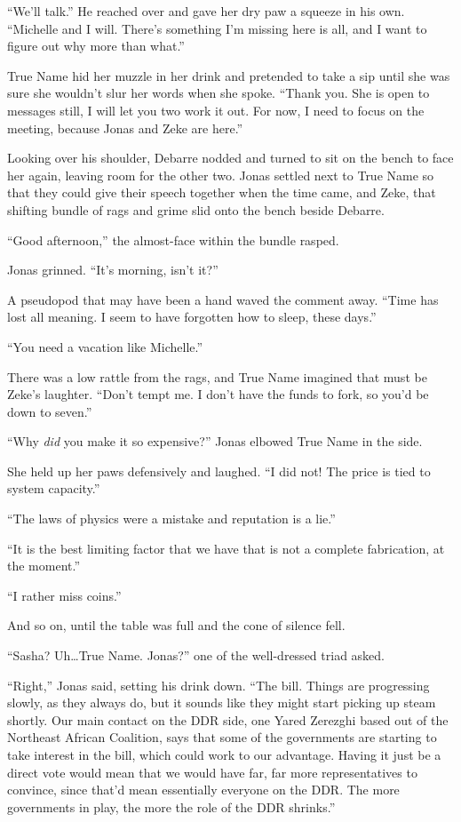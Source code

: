 ``We'll talk.'' He reached over and gave her dry paw a squeeze in his own. ``Michelle and I will. There's something I'm missing here is all, and I want to figure out why more than what.''

True Name hid her muzzle in her drink and pretended to take a sip until she was sure she wouldn't slur her words when she spoke. ``Thank you. She is open to messages still, I will let you two work it out. For now, I need to focus on the meeting, because Jonas and Zeke are here.''

Looking over his shoulder, Debarre nodded and turned to sit on the bench to face her again, leaving room for the other two. Jonas settled next to True Name so that they could give their speech together when the time came, and Zeke, that shifting bundle of rags and grime slid onto the bench beside Debarre.

``Good afternoon,'' the almost-face within the bundle rasped.

Jonas grinned. ``It's morning, isn't it?''

A pseudopod that may have been a hand waved the comment away. ``Time has lost all meaning. I seem to have forgotten how to sleep, these days.''

``You need a vacation like Michelle.''

There was a low rattle from the rags, and True Name imagined that must be Zeke's laughter. ``Don't tempt me. I don't have the funds to fork, so you'd be down to seven.''

``Why \emph{did} you make it so expensive?'' Jonas elbowed True Name in the side.

She held up her paws defensively and laughed. ``I did not! The price is tied to system capacity.''

``The laws of physics were a mistake and reputation is a lie.''

``It is the best limiting factor that we have that is not a complete fabrication, at the moment.''

``I rather miss coins.''

And so on, until the table was full and the cone of silence fell.

``Sasha? Uh\ldots True Name. Jonas?'' one of the well-dressed triad asked.

``Right,'' Jonas said, setting his drink down. ``The bill. Things are progressing slowly, as they always do, but it sounds like they might start picking up steam shortly. Our main contact on the DDR side, one Yared Zerezghi based out of the Northeast African Coalition, says that some of the governments are starting to take interest in the bill, which could work to our advantage. Having it just be a direct vote would mean that we would have far, far more representatives to convince, since that'd mean essentially everyone on the DDR. The more governments in play, the more the role of the DDR shrinks.''

